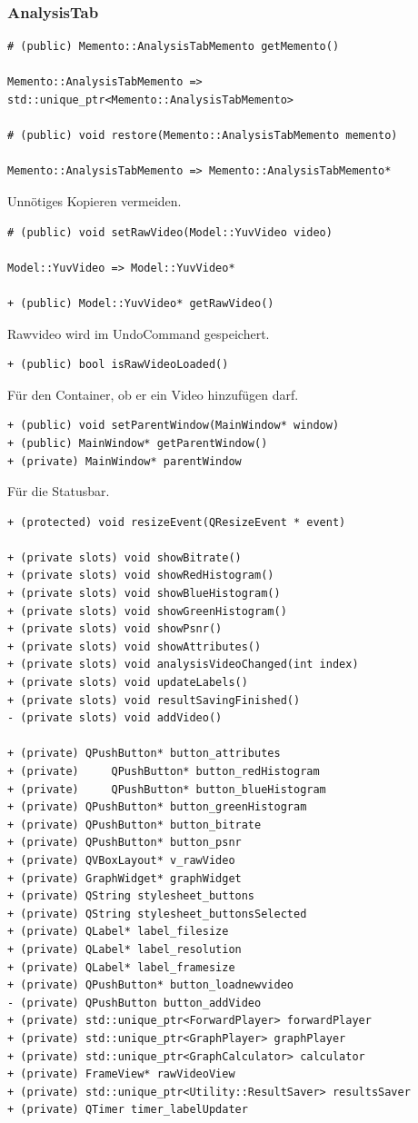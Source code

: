 \documentclass{scrartcl}
\begin{document}
{\subsubsection{AnalysisTab}
\bigskip
\begin{verbatim}
# (public) Memento::AnalysisTabMemento getMemento()

Memento::AnalysisTabMemento => std::unique_ptr<Memento::AnalysisTabMemento>

# (public) void restore(Memento::AnalysisTabMemento memento)

Memento::AnalysisTabMemento => Memento::AnalysisTabMemento*
\end{verbatim}
Unnötiges Kopieren vermeiden.
\bigskip
\begin{verbatim}
# (public) void setRawVideo(Model::YuvVideo video)

Model::YuvVideo => Model::YuvVideo*

+ (public) Model::YuvVideo* getRawVideo()
\end{verbatim}
Rawvideo wird im UndoCommand gespeichert.
\bigskip
\begin{verbatim}
+ (public) bool isRawVideoLoaded()
\end{verbatim}
Für den Container, ob er ein Video hinzufügen darf.
\bigskip
\begin{verbatim}
+ (public) void setParentWindow(MainWindow* window)
+ (public) MainWindow* getParentWindow()
+ (private) MainWindow* parentWindow
\end{verbatim}
Für die Statusbar.
\bigskip
\begin{verbatim}
+ (protected) void resizeEvent(QResizeEvent * event)

+ (private slots) void showBitrate()
+ (private slots) void showRedHistogram()
+ (private slots) void showBlueHistogram()
+ (private slots) void showGreenHistogram()
+ (private slots) void showPsnr()
+ (private slots) void showAttributes()
+ (private slots) void analysisVideoChanged(int index)
+ (private slots) void updateLabels()
+ (private slots) void resultSavingFinished()
- (private slots) void addVideo()

+ (private) QPushButton* button_attributes
+ (private) 	QPushButton* button_redHistogram
+ (private) 	QPushButton* button_blueHistogram
+ (private) QPushButton* button_greenHistogram
+ (private) QPushButton* button_bitrate
+ (private) QPushButton* button_psnr
+ (private) QVBoxLayout* v_rawVideo
+ (private) GraphWidget* graphWidget
+ (private) QString stylesheet_buttons
+ (private) QString stylesheet_buttonsSelected
+ (private) QLabel* label_filesize
+ (private) QLabel* label_resolution
+ (private) QLabel* label_framesize
+ (private) QPushButton* button_loadnewvideo
- (private) QPushButton button_addVideo
+ (private) std::unique_ptr<ForwardPlayer> forwardPlayer
+ (private) std::unique_ptr<GraphPlayer> graphPlayer
+ (private) std::unique_ptr<GraphCalculator> calculator
+ (private) FrameView* rawVideoView
+ (private) std::unique_ptr<Utility::ResultSaver> resultsSaver
+ (private) QTimer timer_labelUpdater
	

\end{verbatim}}
\end{document}
